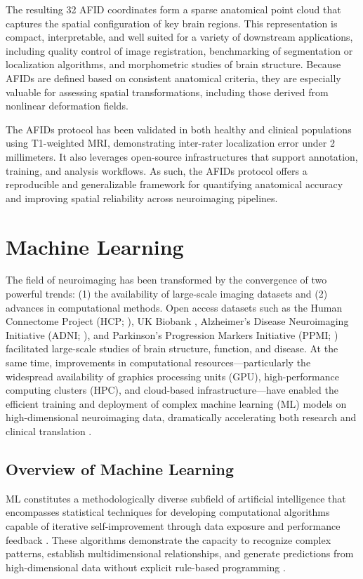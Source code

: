 The resulting 32 AFID coordinates form a sparse anatomical point cloud that captures the spatial configuration of key brain regions. This representation is compact, interpretable, and well suited for a variety of downstream applications, including quality control of image registration, benchmarking of segmentation or localization algorithms, and morphometric studies of brain structure. Because AFIDs are defined based on consistent anatomical criteria, they are especially valuable for assessing spatial transformations, including those derived from nonlinear deformation fields.

The AFIDs protocol has been validated in both healthy and clinical populations using T1-weighted MRI, demonstrating inter-rater localization error under 2 millimeters. It also leverages open-source infrastructures that support annotation, training, and analysis workflows. As such, the AFIDs protocol offers a reproducible and generalizable framework for quantifying anatomical accuracy and improving spatial reliability across neuroimaging pipelines.

\section{Machine Learning}
The field of neuroimaging has been transformed by the convergence of two powerful trends: (1) the availability of large-scale imaging datasets and (2) advances in computational methods. Open access datasets such as the Human Connectome Project (HCP; \cite{Van_Essen2013-yi}), UK Biobank \cite{Sudlow2015-lq}, Alzheimer's Disease Neuroimaging Initiative (ADNI; \cite{Petersen2010-rd}), and Parkinson's Progression Markers Initiative (PPMI; \cite{Marek2018-wx}) facilitated large-scale studies of brain structure, function, and disease. At the same time, improvements in computational resources—particularly the widespread availability of graphics processing units (GPU), high-performance computing clusters (HPC), and cloud-based infrastructure—have enabled the efficient training and deployment of complex machine learning (ML) models on high-dimensional neuroimaging data, dramatically accelerating both research and clinical translation \cite{Bouchard2016-cd,Kirimtat2024-is}.

\subsection{Overview of Machine Learning}
ML constitutes a methodologically diverse subfield of artificial intelligence that encompasses statistical techniques for developing computational algorithms capable of iterative self-improvement through data exposure and performance feedback \cite{Sarker2021-ng}. These algorithms demonstrate the capacity to recognize complex patterns, establish multidimensional relationships, and generate predictions from high-dimensional data without explicit rule-based programming \cite{Davatzikos2019-zq}.

